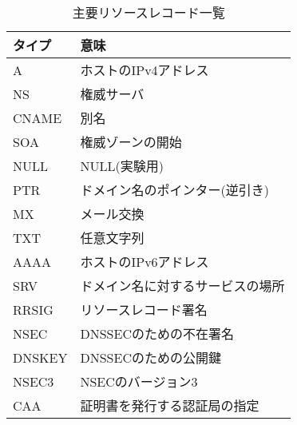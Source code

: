 \begin{table}[h]
 \centering
  \begin{tabular}{ll}
    \toprule
    \textbf{タイプ} & \textbf{意味} \\
    \midrule
    A &  ホストのIPv4アドレス \\
    NS & 権威サーバ \\
    CNAME & 別名 \\
    SOA & 権威ゾーンの開始 \\
    NULL & NULL(実験用) \\
    PTR & ドメイン名のポインター(逆引き) \\
    MX & メール交換 \\
    TXT & 任意文字列 \\
    AAAA & ホストのIPv6アドレス \\
		SRV & ドメイン名に対するサービスの場所\\
    RRSIG & リソースレコード署名\\
    NSEC & DNSSECのための不在署名\\
    DNSKEY & DNSSECのための公開鍵\\
    NSEC3 & NSECのバージョン3\\
    CAA & 証明書を発行する認証局の指定\\
    \bottomrule
  \end{tabular}
 \caption{主要リソースレコード一覧}
 \label{tab:resource-record}
\end{table}
